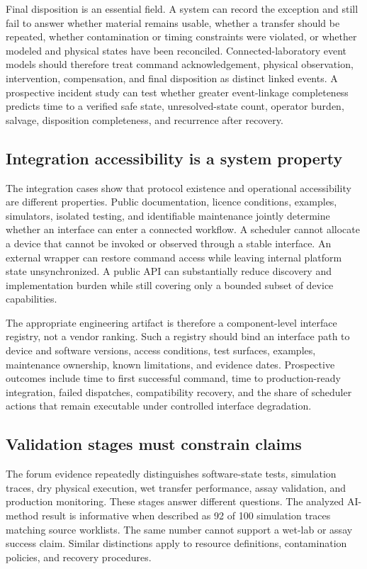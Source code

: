 Final disposition is an essential field. A system can record the exception and still fail to answer whether material remains usable, whether a transfer should be repeated, whether contamination or timing constraints were violated, or whether modeled and physical states have been reconciled. Connected-laboratory event models should therefore treat command acknowledgement, physical observation, intervention, compensation, and final disposition as distinct linked events. A prospective incident study can test whether greater event-linkage completeness predicts time to a verified safe state, unresolved-state count, operator burden, salvage, disposition completeness, and recurrence after recovery.

\subsection{Integration accessibility is a system property}

The integration cases show that protocol existence and operational accessibility are different properties. Public documentation, licence conditions, examples, simulators, isolated testing, and identifiable maintenance jointly determine whether an interface can enter a connected workflow. A scheduler cannot allocate a device that cannot be invoked or observed through a stable interface. An external wrapper can restore command access while leaving internal platform state unsynchronized. A public API can substantially reduce discovery and implementation burden while still covering only a bounded subset of device capabilities.

The appropriate engineering artifact is therefore a component-level interface registry, not a vendor ranking. Such a registry should bind an interface path to device and software versions, access conditions, test surfaces, examples, maintenance ownership, known limitations, and evidence dates. Prospective outcomes include time to first successful command, time to production-ready integration, failed dispatches, compatibility recovery, and the share of scheduler actions that remain executable under controlled interface degradation.

\subsection{Validation stages must constrain claims}

The forum evidence repeatedly distinguishes software-state tests, simulation traces, dry physical execution, wet transfer performance, assay validation, and production monitoring. These stages answer different questions. The analyzed AI-method result is informative when described as 92 of 100 simulation traces matching source worklists. The same number cannot support a wet-lab or assay success claim. Similar distinctions apply to resource definitions, contamination policies, and recovery procedures.

